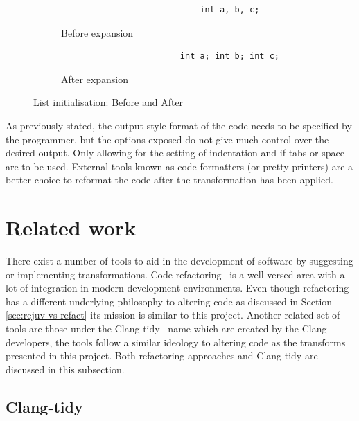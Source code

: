 \documentclass[bsc,frontabs,singlespacing,twoside,parskip,deptreport]{infthesis}
\begin{document}
\begin{figure}[!h]
    \centering
    \begin{subfigure}[h]{\textwidth}
        \centering
        \begin{verbatim}
                            int a, b, c;
        \end{verbatim}
        \caption{Before expansion}
        \label{fig:list-init-before}
        \vspace{0.40cm}
    \end{subfigure}
    \begin{subfigure}[h]{\textwidth}
        \centering
        \begin{verbatim}
                        int a; int b; int c;
        \end{verbatim}
        \caption{After expansion}
        \label{fig:list-init-after}
    \end{subfigure}
    \caption{List initialisation: Before and After}
    \label{fig:list-init}
\end{figure}

As previously stated, the output style format of the code needs to be specified by the programmer, but the options exposed do not give much control over the desired output. Only allowing for the setting of indentation and if tabs or space are to be used. External tools known as code formatters (or pretty printers) are a better choice to reformat the code after the transformation has been applied.

\section{Related work}
There exist a number of tools to aid in the development of software by suggesting or implementing transformations. Code refactoring~\cite{REFACTOR} is a well-versed area with a lot of integration in modern development environments. Even though refactoring has a different underlying philosophy to altering code as discussed in Section \ref{sec:rejuv-vs-refact} its mission is similar to this project. Another related set of tools are those under the Clang-tidy~\cite{CLANG_TIDY} name which are created by the Clang developers, the tools follow a similar ideology to altering code as the transforms presented in this project. Both refactoring approaches and Clang-tidy are discussed in this subsection.

\subsection{Clang-tidy}\label{sec:rw-clang-tidy}
\end{document}

